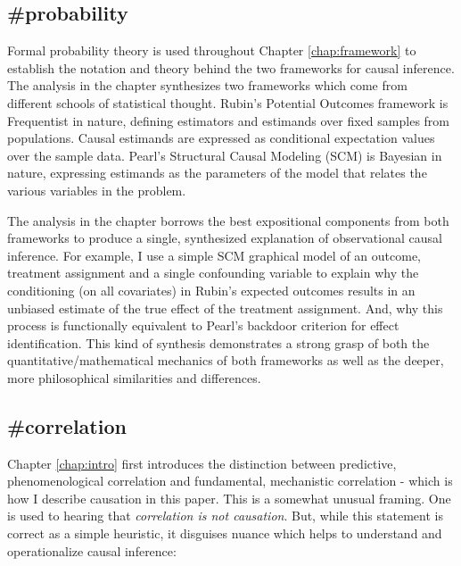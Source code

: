 \documentclass[./main.tex]{subfiles}
\begin{document}
\subsection{\textbf{\#probability}}
\label{hc:probability}

Formal probability theory is used throughout Chapter \ref{chap:framework} to establish the notation and theory behind the two frameworks for causal inference. The analysis in the chapter synthesizes two frameworks which come from different schools of statistical thought. Rubin's Potential Outcomes framework is Frequentist in nature, defining estimators and estimands over fixed samples from populations. Causal estimands are expressed as conditional expectation values over the sample data. Pearl's Structural Causal Modeling (SCM) is Bayesian in nature, expressing estimands as the parameters of the model that relates the various variables in the problem.

\vspace{\baselineskip}

The analysis in the chapter borrows the best expositional components from both frameworks to produce a single, synthesized explanation of observational causal inference. For example, I use a simple SCM graphical model of an outcome, treatment assignment and a single confounding variable to explain why the conditioning (on all covariates) in Rubin's expected outcomes results in an unbiased estimate of the true effect of the treatment assignment. And, why this process is functionally equivalent to Pearl's backdoor criterion for effect identification. This kind of synthesis demonstrates a strong grasp of both the quantitative/mathematical mechanics of both frameworks as well as the deeper, more philosophical similarities and differences.


\subsection{\textbf{\#correlation}}
\label{hc:correlation}

Chapter \ref{chap:intro} first introduces the distinction between predictive, phenomenological correlation and fundamental, mechanistic correlation - which is how I describe causation in this paper. This is a somewhat unusual framing. One is used to hearing that \textit{correlation is not causation}. But, while this statement is correct as a simple heuristic, it disguises nuance which helps to understand and operationalize causal inference:
\end{document}

